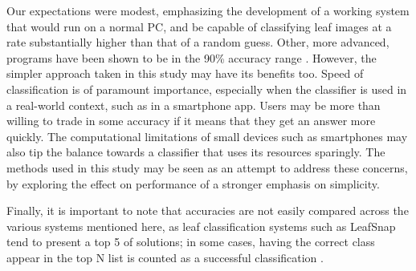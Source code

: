 Our expectations were modest, emphasizing the development of a working system that would run on a normal PC, and be capable of classifying leaf images at a rate substantially higher than that of a random guess. Other, more advanced, programs have been shown to be in the 90\% accuracy range \cite{Wang2011, Kaly2015}.
However, the simpler approach taken in this study may have its benefits too. Speed of classification is of paramount importance, especially when the classifier is used in a real-world context, such as in a smartphone app. Users may be more than willing to trade in some accuracy if it means that they get an answer more quickly. The computational limitations of small devices such as smartphones may also tip the balance towards a classifier that uses its resources sparingly. 
The methods used in this study may be seen as an attempt to address these concerns, by exploring the effect on performance of a stronger emphasis on simplicity.

Finally, it is important to note that accuracies are not easily compared across the various systems mentioned here, as leaf classification systems such as LeafSnap tend to present a top 5 of solutions; in some cases, having the correct class appear in the top N list is counted as a successful classification \cite{Wang2011}.
 	